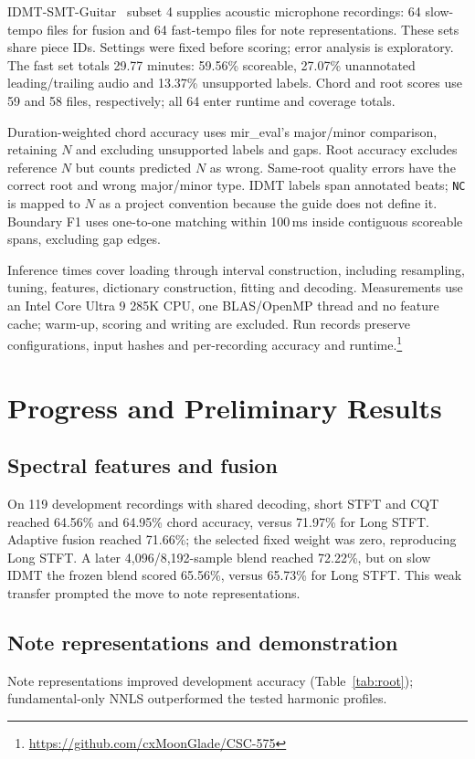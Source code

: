\documentclass{article}
\begin{document}
IDMT-SMT-Guitar\ \cite{idmt} subset 4 supplies acoustic microphone recordings: 64 slow-tempo files for fusion and 64 fast-tempo files for note representations. These sets share piece IDs. Settings were fixed before scoring; error analysis is exploratory. The fast set totals 29.77 minutes: 59.56\% scoreable, 27.07\% unannotated leading/trailing audio and 13.37\% unsupported labels. Chord and root scores use 59 and 58 files, respectively; all 64 enter runtime and coverage totals.

Duration-weighted chord accuracy uses mir\_eval's major/minor comparison, retaining $N$ and excluding unsupported labels and gaps. Root accuracy excludes reference $N$ but counts predicted $N$ as wrong. Same-root quality errors have the correct root and wrong major/minor type. IDMT labels span annotated beats; \texttt{NC} is mapped to $N$ as a project convention because the guide does not define it. Boundary F1 uses one-to-one matching within 100\,ms inside contiguous scoreable spans, excluding gap edges.

Inference times cover loading through interval construction, including resampling, tuning, features, dictionary construction, fitting and decoding. Measurements use an Intel Core Ultra 9 285K CPU, one BLAS/OpenMP thread and no feature cache; warm-up, scoring and writing are excluded. Run records preserve configurations, input hashes and per-recording accuracy and runtime.\footnote{\url{https://github.com/cxMoonGlade/CSC-575}}

\section{Progress and Preliminary Results}
\subsection{Spectral features and fusion}
\label{sec:fusion}
On 119 development recordings with shared decoding, short STFT and CQT reached 64.56\% and 64.95\% chord accuracy, versus 71.97\% for Long STFT. Adaptive fusion reached 71.66\%; the selected fixed weight was zero, reproducing Long STFT. A later 4,096/8,192-sample blend reached 72.22\%, but on slow IDMT the frozen blend scored 65.56\%, versus 65.73\% for Long STFT. This weak transfer prompted the move to note representations.

\subsection{Note representations and demonstration}
\label{sec:comparison}
Note representations improved development accuracy (Table~\ref{tab:root}); fundamental-only NNLS outperformed the tested harmonic profiles.
\end{document}
